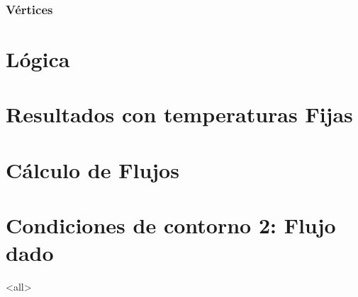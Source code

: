 \subsubsection{Vértices} 

\section{Lógica}

\section{Resultados con temperaturas Fijas}

\section{Cálculo de Flujos}

\section{Condiciones de contorno 2: Flujo dado}

\mode<all>
%
%
%
%
%

